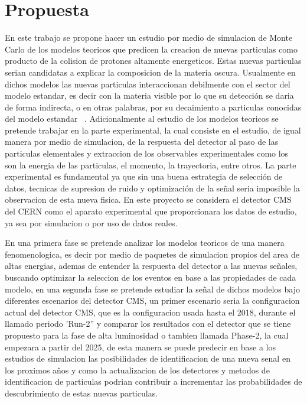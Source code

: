 \chapter{Propuesta}

En este trabajo se propone hacer un estudio por medio de simulacion de Monte Carlo de los modelos teoricos que predicen la creacion de nuevas particulas como producto de la colision de protones altamente energeticos. Estas nuevas particulas serian candidatas a explicar la composicion de la materia oscura.  Usualmente en dichos modelos las nuevas particulas interaccionan debilmente con el sector del modelo estandar, es decir con la materia visible por lo que su detecci\'on se daria de forma indirecta, o en otras palabras, por su decaimiento a particulas conocidas del modelo estandar~\cite{Curtin2015} .  Adicionalmente al estudio de los modelos teoricos se pretende trabajar en la parte experimental, la cual consiste en el estudio, de igual manera por medio de simulacion, de la respuesta del detector al paso de las particulas elementales y extraccion de los observables experimentales como los son la energia de las particulas, el momento, la trayectoria, entre otros.  La parte experimental es fundamental ya que sin una buena estrategia de selecci\'on de datos, tecnicas de supresion de ruido y optimizaci\'on de la se\~nal seria imposible la observacion de esta nueva fisica. En este proyecto se considera el detector CMS del CERN como el aparato experimental que proporcionara los datos de estudio, ya sea por simulacion o por uso de datos reales.  

En una primera fase se pretende analizar los modelos teoricos de una manera fenomenologica, es decir por medio de paquetes de simulacion propios del area de altas energias, ademas de entender la respuesta del detector a las nuevas se\~nales, buscando optimizar la seleccion de los eventos en base a las propiedades de cada modelo, en una segunda fase se pretende estudiar la se\~nal de dichos modelos bajo diferentes escenarios del detector CMS, un primer escenario seria la configuracion actual del detector CMS, que es la configuracion usada hasta el 2018, durante el llamado periodo 'Run-2'' y comparar los resultados con el detector que se tiene propuesto para la fase de alta luminosidad o tambien llamada Phase-2, la cual empezara  a partir del 2025, de esta manera se puede predecir en base a los estudios de simulacion las posibilidades de identificacion de una nueva senal en los proximos a\~nos y como la actualizacion de los detectores y metodos de identificacion de particulas podrian contribuir a incrementar las probabilidades de descubrimiento de estas nuevas particulas. 


